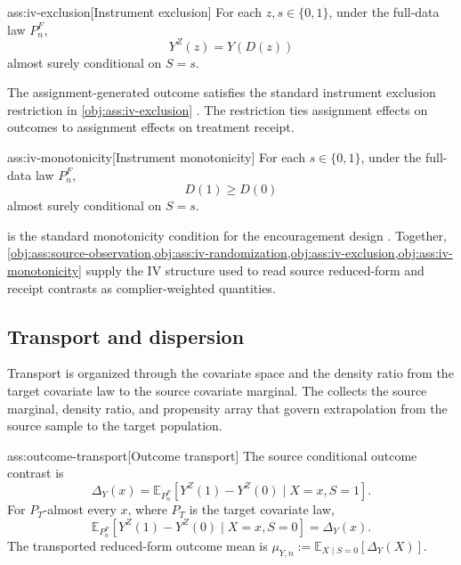 \documentclass[11pt]{article}
\begin{document}
\begin{assumptionv}{ass:iv-exclusion}[Instrument exclusion]
For each \(z,s\in\{0,1\}\), under the full-data law \(P_n^F\),
\[
Y^Z(z)=Y(D(z))
\]
almost surely conditional on \(S=s\).
\end{assumptionv}

The assignment-generated outcome  satisfies the standard instrument exclusion restriction in \cref{obj:ass:iv-exclusion} \citep{ChenHuang2025}. The restriction ties assignment effects on outcomes to assignment effects on treatment receipt.

\begin{assumptionv}{ass:iv-monotonicity}[Instrument monotonicity]
For each \(s\in\{0,1\}\), under the full-data law \(P_n^F\),
\[
D(1)\ge D(0)
\]
almost surely conditional on \(S=s\).
\end{assumptionv}

 is the standard monotonicity condition for the encouragement design \citep{ChenHuang2025}. Together, \cref{obj:ass:source-observation,obj:ass:iv-randomization,obj:ass:iv-exclusion,obj:ass:iv-monotonicity} supply the IV structure used to read source reduced-form and receipt contrasts as complier-weighted quantities.

\subsection{Transport and dispersion}

Transport is organized through the covariate space  and the density ratio  from the target covariate law to the source covariate marginal. The  collects the source marginal, density ratio, and propensity array that govern extrapolation from the source sample to the target population.

\begin{assumptionv}{ass:outcome-transport}[Outcome transport]
The source conditional outcome contrast is
\[
\Delta_Y(x)
=
\mathbb E_{P_n^F}\!\left[Y^Z(1)-Y^Z(0)\mid X=x,S=1\right].
\]
For \(P_T\)-almost every \(x\), where \(P_T\) is the target covariate law,
\[
\mathbb E_{P_n^F}\!\left[Y^Z(1)-Y^Z(0)\mid X=x,S=0\right]
=
\Delta_Y(x).
\]
The transported reduced-form outcome mean is \(\mu_{Y,n}:=\mathbb E_{X\mid S=0}[\Delta_Y(X)]\).
\end{assumptionv}
\end{document}
